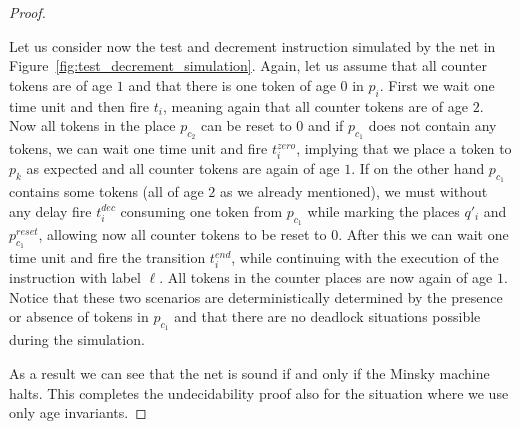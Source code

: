 \begin{proof}
\begin{figure}[h]
\begin{center}
\begin{minipage}[c]{\textwidth}
  \end{minipage}
\end{center}
\end{figure}

Let us consider now the test and decrement instruction simulated by
the net in Figure~\ref{fig:test_decrement_simulation}. Again, let us assume
that all counter tokens are of age $1$ and that there is one token
of age $0$ in $p_i$. First we wait one time unit and then fire $t_i$,
meaning again that all counter tokens are of age $2$. Now all
tokens in the place $p_{c_2}$ can be reset to $0$ and if $p_{c_1}$
does not contain any tokens, we can wait one time unit and fire
$t_i^{\mathit zero}$, implying that we place a token to $p_k$
as expected and all counter tokens are again of age $1$.
If on the other hand $p_{c_1}$ contains some tokens (all of age $2$
as we already mentioned), we must without any delay fire
$t_i^{\mathit dec}$ consuming one token from $p_{c_1}$ while marking
the places $q'_i$ and $p^{\mathit reset}_{c_1}$, allowing
now all counter tokens to be reset to $0$. After this we can wait
one time unit and fire the transition $t_i^{\mathit end}$, while
continuing with the execution of the instruction with label $\ell$.
All tokens in the counter places are now again of age $1$.
Notice that these two scenarios are deterministically determined
by the presence or absence of tokens in $p_{c_1}$ and that there are
no deadlock situations possible during the simulation.

As a result
we can see that the net is sound if and only if
the Minsky machine halts. This completes the undecidability proof
also for the situation where we use only age invariants.
\end{proof}

